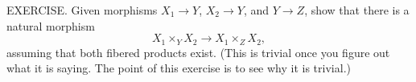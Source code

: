 EXERCISE. Given morphisms $X_1\to Y$, $X_2\to Y$, and $Y\to Z$, show that there is a natural morphism
$$X_1\times_YX_2\to X_1\times_ZX_2,$$
assuming that both fibered products exist. (This is trivial once you figure out what it is saying. The point of this exercise is to see why it is trivial.)
